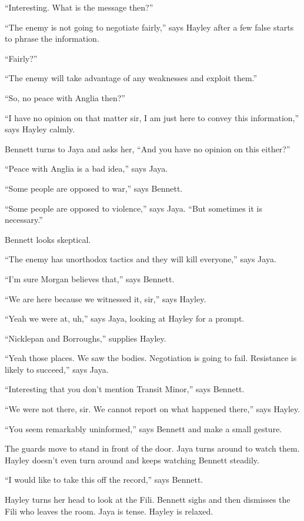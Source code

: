 ``Interesting.   What is the message then?''

``The enemy is not going to negotiate fairly,'' says Hayley after a few false starts to phrase the information.

``Fairly?''

``The enemy will take advantage of any weaknesses and exploit them.''

``So, no peace with Anglia then?''

``I have no opinion on that matter sir, I am just here to convey this information,'' says Hayley calmly.

Bennett turns to Jaya and asks her, ``And you have no opinion on this either?''

``Peace with Anglia is a bad idea,'' says Jaya.

``Some people are opposed to war,'' says Bennett.

``Some people are opposed to violence,'' says Jaya.  ``But sometimes it is necessary.''

Bennett looks skeptical.

``The enemy has unorthodox tactics and they will kill everyone,'' says Jaya.

``I'm sure Morgan believes that,'' says Bennett.

``We are here because we witnessed it, sir,'' says Hayley.

``Yeah we were at, uh,'' says Jaya, looking at Hayley for a prompt.

``Nicklepan and Borroughs,'' supplies Hayley.

``Yeah those places.  We saw the bodies.  Negotiation is going to fail.  Resistance is likely to succeed,'' says Jaya.

``Interesting that you don't mention Transit Minor,'' says Bennett.

``We were not there, sir.  We cannot report on what happened there,'' says Hayley.

``You seem remarkably uninformed,'' says Bennett and make a small gesture.

The guards move to stand in front of the door.  Jaya turns around to watch them.  Hayley doesn't even turn around and keeps watching Bennett steadily.

``I would like to take this off the record,'' says Bennett.

Hayley turns her head to look at the Fili.  Bennett sighs and then dismisses the Fili who leaves the room.  Jaya is tense.  Hayley is relaxed.

